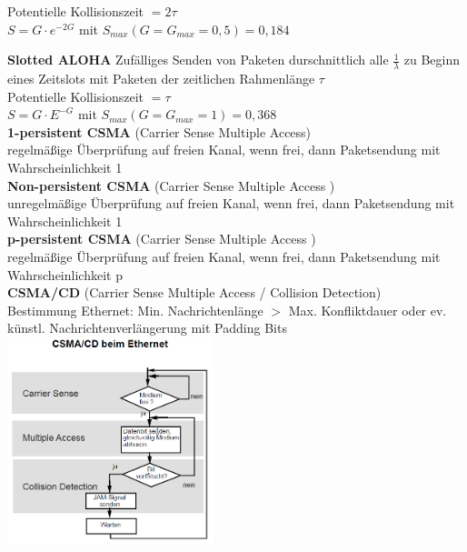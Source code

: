 \documentclass[fs, footer]{latex4ei}
\begin{document}
\begin{multicols*}{4}
{		Potentielle Kollisionszeit $ = 2 \tau $ \\
		$ S = G \cdot e^{-2G} $ mit $ S_{max}(G = G_{max} = 0,5) = 0,184 $

	\textbf{Slotted ALOHA}
		Zufälliges Senden von Paketen durschnittlich alle $\frac{1}{\lambda}$ zu Beginn eines Zeitslots mit Paketen der zeitlichen Rahmenlänge $ \tau $ \\
		
		Potentielle Kollisionszeit $ = \tau $ \\
		$ S = G \cdot E^{-G} $ mit $ S_{max}(G = G_{max} = 1) = 0,368 $ \\
		
	\textbf{1-persistent CSMA} (Carrier Sense Multiple Access) \\
		regelmäßige Überprüfung auf freien Kanal, wenn frei, dann Paketsendung mit Wahrscheinlichkeit 1 \\
		
	\textbf{Non-persistent CSMA} (Carrier Sense Multiple Access ) \\
		unregelmäßige Überprüfung auf freien Kanal, wenn frei, dann Paketsendung mit Wahrscheinlichkeit 1 \\
	
	\textbf{p-persistent CSMA} (Carrier Sense Multiple Access )  \\
		regelmäßige Überprüfung auf freien Kanal, wenn frei, dann Paketsendung mit Wahrscheinlichkeit p \\
		
	\textbf{CSMA/CD} (Carrier Sense Multiple Access / Collision Detection) \\
		Bestimmung Ethernet:  Min. Nachrichtenlänge $ > $  Max. Konfliktdauer oder ev. künstl. Nachrichtenverlängerung mit Padding Bits \\

	\includegraphics[width = 6cm]{./img/CSMA_CD.png}

}



\end{multicols*}
\end{document}
